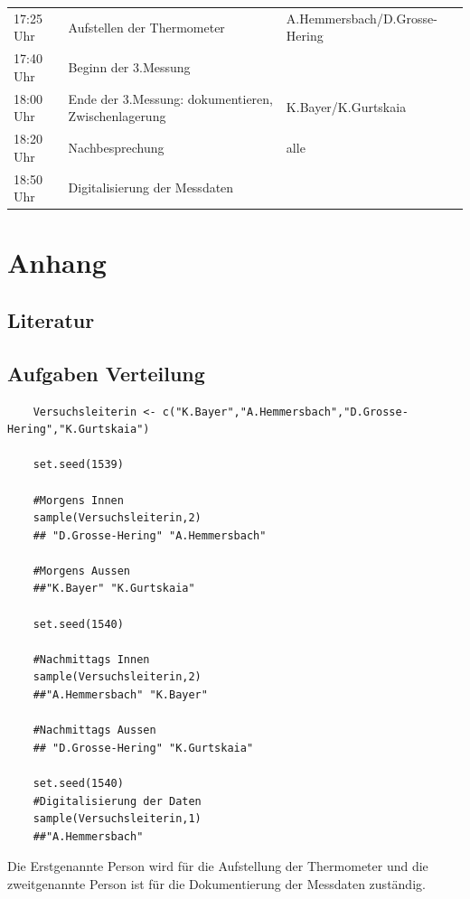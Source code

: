 \documentclass[ ngerman, fontsize= 12pt, paper=a4, headings=big, titlepage=true]{article}
\begin{document}
\begin{table}[h]
\begin{tabular}{l|l|l}
		17:25 Uhr	&	Aufstellen der Thermometer						&A.Hemmersbach/D.Grosse-Hering\\
		17:40 Uhr	&	Beginn der 3.Messung							& \\
		18:00 Uhr	& 	Ende der 3.Messung: dokumentieren, Zwischenlagerung & K.Bayer/K.Gurtskaia\\
		
		\hline
		
		18:20 Uhr	&	Nachbesprechung									& alle \\
		18:50 Uhr	& 	Digitalisierung der Messdaten					&\\
		
		
	\end{tabular}
\end{table}
\newpage

 \newpage

\renewcommand{\thesubsection}{\Alph{subsection}}


\section{Anhang}

\subsection{Literatur}
%
\printbibliography
\subsection{Aufgaben Verteilung} \label{Verteilung}
\begin{lstlisting}
	Versuchsleiterin <- c("K.Bayer","A.Hemmersbach","D.Grosse-Hering","K.Gurtskaia")
	
	set.seed(1539)
	
	#Morgens Innen
	sample(Versuchsleiterin,2)
	## "D.Grosse-Hering" "A.Hemmersbach" 
	
	#Morgens Aussen
	##"K.Bayer" "K.Gurtskaia"
	
	set.seed(1540)
	
	#Nachmittags Innen
	sample(Versuchsleiterin,2)
	##"A.Hemmersbach" "K.Bayer"
	
	#Nachmittags Aussen
	## "D.Grosse-Hering" "K.Gurtskaia"
	
	set.seed(1540)
	#Digitalisierung der Daten
	sample(Versuchsleiterin,1)
	##"A.Hemmersbach"
\end{lstlisting}

Die Erstgenannte Person wird für die Aufstellung der Thermometer und die zweitgenannte Person ist für die Dokumentierung der Messdaten zuständig.	
\end{document}
